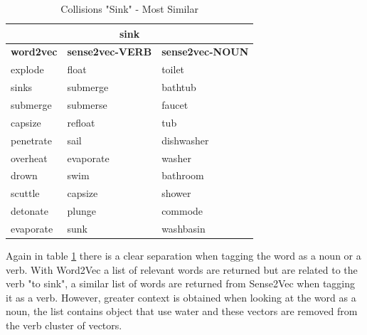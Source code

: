 \begin{table}[h]
\centering
\begin{tabular}{|l|l|l|}
\hline
\multicolumn{3}{|c|}{\textbf{sink}}                                                                                                   \\ \hline
\multicolumn{1}{|c|}{\textbf{word2vec}} & \multicolumn{1}{c|}{\textbf{sense2vec-VERB}} & \multicolumn{1}{c|}{\textbf{sense2vec-NOUN}} \\ \hline
explode                                 & float                                        & toilet                                       \\ \hline
sinks                                   & submerge                                     & bathtub                                      \\ \hline
submerge                                & submerse                                     & faucet                                       \\ \hline
capsize                                 & refloat                                      & tub                                          \\ \hline
penetrate                               & sail                                         & dishwasher                                   \\ \hline
overheat                                & evaporate                                    & washer                                       \\ \hline
drown                                   & swim                                         & bathroom                                     \\ \hline
scuttle                                 & capsize                                      & shower                                       \\ \hline
detonate                                & plunge                                       & commode                                      \\ \hline
evaporate                               & sunk                                         & washbasin                                    \\ \hline
\end{tabular}
\caption{Collisions "Sink" - Most Similar}
\label{Collisions "Sink" - Most Similar}
\end{table}

\noindent
Again in table \ref{Collisions "Sink" - Most Similar} there is a clear separation when tagging the word as a noun or a verb. With Word2Vec a list of relevant words are returned but are related to the verb "to sink", a similar list of words are returned from Sense2Vec when tagging it as a verb. However, greater context is obtained when looking at the word as a noun, the list contains object that use water and these vectors are removed from the verb cluster of vectors.


